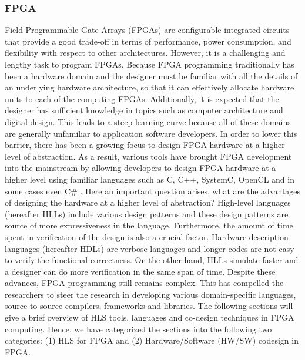 \subsubsection{FPGA}
Field Programmable Gate Arrays (FPGAs) are configurable
integrated circuits that provide a good trade-off in
terms of performance, power consumption, and flexibility with
respect to other architectures. However, it is a challenging and lengthy task to program FPGAs. Because FPGA programming traditionally has been a hardware domain and the designer must be familiar with all the details of an underlying hardware architecture, so that it can effectively allocate hardware units to each of the computing FPGAs. Additionally, it is expected that the designer has sufficient knowledge in topics such as computer architecture and digital design. This leads to a steep learning curve because all of these domains are generally unfamiliar to application software developers. In order to lower this barrier, there has been a growing focus to design FPGA hardware at a higher level of abstraction. As a result, various tools have brought FPGA development into the mainstream by allowing developers to design FPGA hardware at a higher level using familiar languages such as C, C++, SystemC, OpenCL and in some cases even C\# \cite{kiwiHLS}. Here an important question arises, what are the advantages of designing the hardware at a higher level of abstraction? High-level languages (hereafter HLLs) include various design patterns and these design patterns are source of more expressiveness in the language. Furthermore, the amount of time spent in verification of the design is also a crucial factor. Hardware-description languages (hereafter HDLs) are verbose languages and longer codes are not easy to verify the functional correctness. On the other hand, HLLs simulate faster and a designer can do more verification in the same span of time. Despite these advances, FPGA programming still remains complex. This has compelled the researchers to steer the research in developing various domain-specific languages, source-to-source compilers, frameworks and libraries. The following sections will give a brief overview of HLS tools, languages and co-design techniques in FPGA computing. Hence, we have categorized the sections into the following two categories: (1) HLS for FPGA and (2) Hardware/Software (HW/SW) codesign in FPGA.

